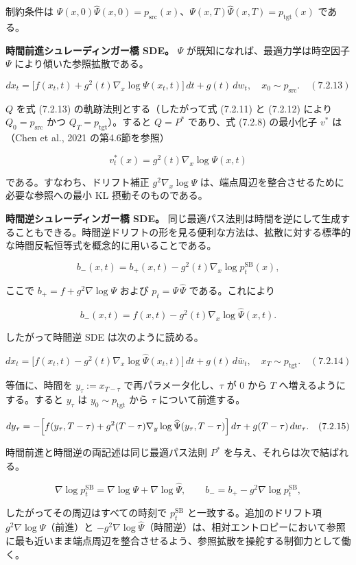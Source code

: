 制約条件は $\Psi(x,0)\widehat{\Psi}(x,0)=p_{\mathrm{src}}(x)$、$\Psi(x,T)\widehat{\Psi}(x,T)=p_{\mathrm{tgt}}(x)$ である。

\textbf{時間前進シュレーディンガー橋 SDE。} $\Psi$ が既知になれば、最適力学は時空因子 $\Psi$ により傾いた参照拡散である。

\[
dx_t=\bigl[f(x_t,t)+g^2(t)\nabla_x\log\Psi(x_t,t)\bigr]\,dt+g(t)\,dw_t,
\quad x_0\sim p_{\mathrm{src}}.
\quad (7.2.13)
\]


$Q$ を式 (7.2.13) の軌跡法則とする（したがって式 (7.2.11) と (7.2.12) により $Q_0=p_{\mathrm{src}}$ かつ $Q_T=p_{\mathrm{tgt}}$）。すると $Q=P^*$ であり、式 (7.2.8) の最小化子 $v^*$ は（Chen et al., 2021 の第4.6節を参照）

\[
v_t^*(x)=g^2(t)\nabla_x\log\Psi(x,t)
\]


である。すなわち、ドリフト補正 $g^2\nabla_x\log\Psi$ は、端点周辺を整合させるために必要な参照への最小 KL 摂動そのものである。

\textbf{時間逆シュレーディンガー橋 SDE。} 同じ最適パス法則は時間を逆にして生成することもできる。時間逆ドリフトの形を見る便利な方法は、拡散に対する標準的な時間反転恒等式を概念的に用いることである。

\[
b_-(x,t)=b_+(x,t)-g^2(t)\nabla_x\log p_t^{\mathrm{SB}}(x),
\]


ここで $b_+=f+g^2\nabla\log\Psi$ および $p_t=\Psi\,\widehat{\Psi}$ である。これにより

\[
b_-(x,t)=f(x,t)-g^2(t)\nabla_x\log\widehat{\Psi}(x,t).
\]


したがって時間逆 SDE は次のように読める。

\[
dx_t=\bigl[f(x_t,t)-g^2(t)\nabla_x\log\widehat{\Psi}(x_t,t)\bigr]\,dt+g(t)\,d\bar{w}_t,
\quad x_T\sim p_{\mathrm{tgt}}.
\quad (7.2.14)
\]


等価に、時間を $y_\tau:=x_{T-\tau}$ で再パラメータ化し、$\tau$ が $0$ から $T$ へ増えるようにする。すると $y_\tau$ は $y_0\sim p_{\mathrm{tgt}}$ から $\tau$ について前進する。

\[
dy_\tau=
-\Bigl[f(y_\tau,T-\tau)+g^2(T-\tau)\nabla_y\log\widehat{\Psi}(y_\tau,T-\tau)\Bigr]\,d\tau
+g(T-\tau)\,dw_\tau.
\quad (7.2.15)
\]


時間前進と時間逆の両記述は同じ最適パス法則 $P^*$ を与え、それらは次で結ばれる。

\[
\nabla\log p_t^{\mathrm{SB}}=\nabla\log\Psi+\nabla\log\widehat{\Psi},
\qquad
b_-=b_+-g^2\nabla\log p_t^{\mathrm{SB}},
\]


したがってその周辺はすべての時刻で $p_t^{\mathrm{SB}}$ と一致する。追加のドリフト項 $g^2\nabla\log\Psi$（前進）と $-g^2\nabla\log\widehat{\Psi}$（時間逆）は、相対エントロピーにおいて参照に最も近いまま端点周辺を整合させるよう、参照拡散を操舵する制御力として働く。

